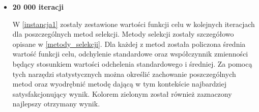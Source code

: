 \begin{itemize}
\item  \textbf{20 000 iteracji}\\
\par
 W \ref{instancja1} zostały zestawione wartości funkcji celu w kolejnych iteracjach dla poszczególnych metod selekcji. Metody selekcji zostały szczegółowo opisane w \ref{metody_selekcji}. Dla każdej z metod została policzona średnia wartość funkcji celu, odchylenie standardowe oraz współczynnik zmienności będący stosunkiem wartości odchelenia standardowego i średniej. Za pomocą tych narzędzi statystycznych można określić zachowanie poszczególnych metod oraz wyodrębnić metodę dającą w tym kontekście najbardziej satysfakcjonujący wynik. Kolorem zielonym został również zaznaczony najlepszy otrzymany wynik.\\
\par
\begin{table}[h!]
\begin{center}
\end{center}
\end{table}
\end{itemize}
